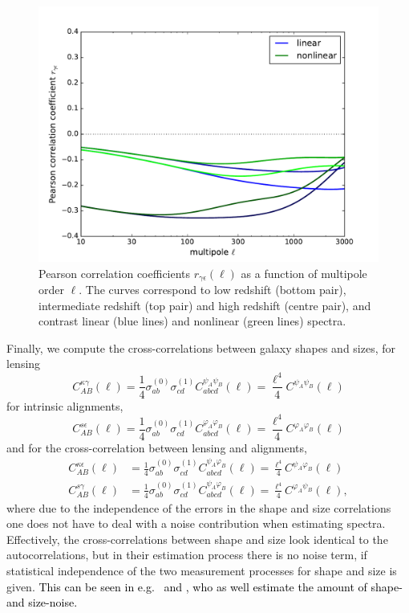 \documentclass[a4paper,fleqn,usenatbib]{mnras}
\newcommand\BG[1]{\textcolor{black}{#1}}
\begin{document}
\begin{figure}
\centering
\includegraphics[scale=0.45]{./figures/pearson_coefficient.pdf}
\caption{Pearson correlation coefficients $r_{\gamma\epsilon}(\ell)$ as a function of multipole order $\ell$. The curves correspond to low redshift (bottom pair), intermediate redshift (top pair) and high redshift (centre pair), and contrast linear (blue lines) and nonlinear (green lines) spectra.}
\label{fig:pearson}
\end{figure}

Finally, we compute the cross-correlations between galaxy shapes and sizes, for lensing
\begin{equation}
C_{AB}^{\kappa\gamma}(\ell) = \frac{1}{4}\sigma^{(0)}_{ab}\sigma^{(1)}_{cd}C^{\psi_A\psi_B}_{abcd}(\ell) = \frac{\ell^4}{4}C^{\psi_A\psi_B}(\ell)
\end{equation}
for intrinsic alignments,
\begin{equation}
C_{AB}^{s\epsilon}(\ell) = \frac{1}{4}\sigma^{(0)}_{ab}\sigma^{(1)}_{cd}C^{\varphi_A\varphi_B}_{abcd}(\ell) = \frac{\ell^4}{4}C^{\varphi_A\varphi_B}(\ell)
\end{equation}
and for the cross-correlation between lensing and alignments,
\begin{align}
C_{AB}^{\kappa\epsilon}(\ell) & = \frac{1}{4}\sigma^{(0)}_{ab}\sigma^{(1)}_{cd}C^{\psi_A\varphi_B}_{abcd}(\ell) = \frac{\ell^4}{4}C^{\psi_A\varphi_B}(\ell)\\
C_{AB}^{s\gamma}(\ell) & = \frac{1}{4}\sigma^{(0)}_{ab}\sigma^{(1)}_{cd}C^{\psi_A\varphi_B}_{abcd}(\ell) = \frac{\ell^4}{4}C^{\varphi_A\psi_B}(\ell),
\end{align}
where due to the independence of the errors in the shape and size correlations one does not have to deal with a noise contribution when estimating spectra. Effectively, the cross-correlations between shape and size look identical to the autocorrelations, but in their estimation process there is no noise term, if statistical independence of the two measurement processes for shape and size is given. \BG{This can be seen in e.g.~\cite{heavens_combining_2013} and \cite{alsing_weak_2014}, who as well estimate the amount of shape- and size-noise.}
\end{document}
